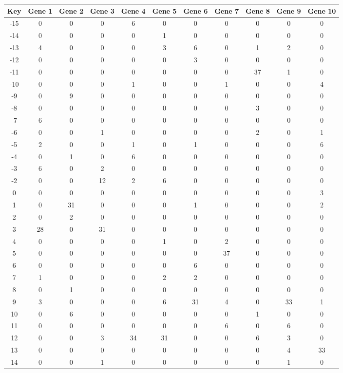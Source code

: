 \begin{tabular}{|c|c|c|c|c|c|c|c|c|c|c|}
\hline
Key & Gene 1 & Gene 2 & Gene 3 & Gene 4 & Gene 5 & Gene 6 & Gene 7 & Gene 8 & Gene 9 & Gene 10 \\
\hline
-15 & 0 & 0 & 0 & 6 & 0 & 0 & 0 & 0 & 0 & 0 \\
-14 & 0 & 0 & 0 & 0 & 1 & 0 & 0 & 0 & 0 & 0 \\
-13 & 4 & 0 & 0 & 0 & 3 & 6 & 0 & 1 & 2 & 0 \\
-12 & 0 & 0 & 0 & 0 & 0 & 3 & 0 & 0 & 0 & 0 \\
-11 & 0 & 0 & 0 & 0 & 0 & 0 & 0 & 37 & 1 & 0 \\
-10 & 0 & 0 & 0 & 1 & 0 & 0 & 1 & 0 & 0 & 4 \\
-9 & 0 & 9 & 0 & 0 & 0 & 0 & 0 & 0 & 0 & 0 \\
-8 & 0 & 0 & 0 & 0 & 0 & 0 & 0 & 3 & 0 & 0 \\
-7 & 6 & 0 & 0 & 0 & 0 & 0 & 0 & 0 & 0 & 0 \\
-6 & 0 & 0 & 1 & 0 & 0 & 0 & 0 & 2 & 0 & 1 \\
-5 & 2 & 0 & 0 & 1 & 0 & 1 & 0 & 0 & 0 & 6 \\
-4 & 0 & 1 & 0 & 6 & 0 & 0 & 0 & 0 & 0 & 0 \\
-3 & 6 & 0 & 2 & 0 & 0 & 0 & 0 & 0 & 0 & 0 \\
-2 & 0 & 0 & 12 & 2 & 6 & 0 & 0 & 0 & 0 & 0 \\
0 & 0 & 0 & 0 & 0 & 0 & 0 & 0 & 0 & 0 & 3 \\
1 & 0 & 31 & 0 & 0 & 0 & 1 & 0 & 0 & 0 & 2 \\
2 & 0 & 2 & 0 & 0 & 0 & 0 & 0 & 0 & 0 & 0 \\
3 & 28 & 0 & 31 & 0 & 0 & 0 & 0 & 0 & 0 & 0 \\
4 & 0 & 0 & 0 & 0 & 1 & 0 & 2 & 0 & 0 & 0 \\
5 & 0 & 0 & 0 & 0 & 0 & 0 & 37 & 0 & 0 & 0 \\
6 & 0 & 0 & 0 & 0 & 0 & 6 & 0 & 0 & 0 & 0 \\
7 & 1 & 0 & 0 & 0 & 2 & 2 & 0 & 0 & 0 & 0 \\
8 & 0 & 1 & 0 & 0 & 0 & 0 & 0 & 0 & 0 & 0 \\
9 & 3 & 0 & 0 & 0 & 6 & 31 & 4 & 0 & 33 & 1 \\
10 & 0 & 6 & 0 & 0 & 0 & 0 & 0 & 1 & 0 & 0 \\
11 & 0 & 0 & 0 & 0 & 0 & 0 & 6 & 0 & 6 & 0 \\
12 & 0 & 0 & 3 & 34 & 31 & 0 & 0 & 6 & 3 & 0 \\
13 & 0 & 0 & 0 & 0 & 0 & 0 & 0 & 0 & 4 & 33 \\
14 & 0 & 0 & 1 & 0 & 0 & 0 & 0 & 0 & 1 & 0 \\
\hline
\end{tabular}